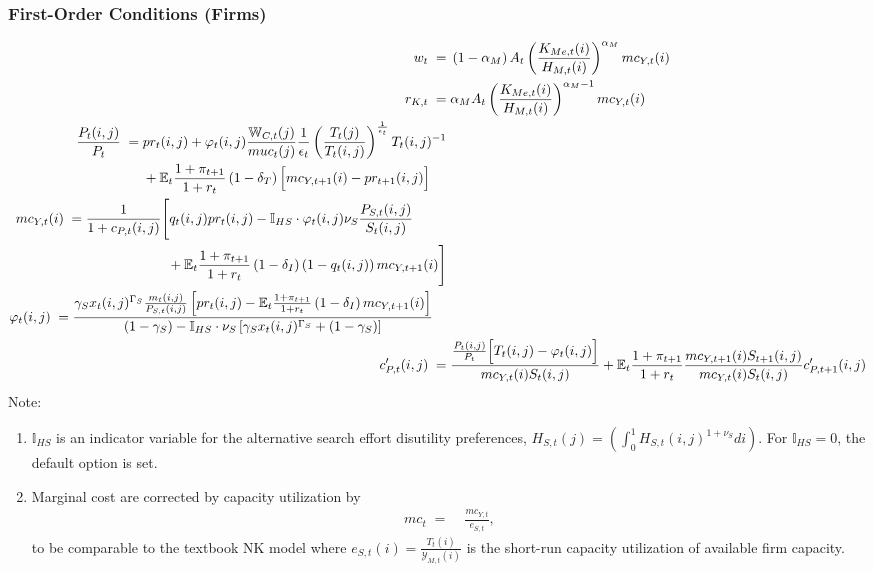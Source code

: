 \documentclass[12pt,3p,authoryear,review]{elsarticle}
\begin{document}
\subsubsection{First-Order Conditions (Firms)}%
\vspace{-0.2in}%
\begin{small}%
	\begin{align}%
		w_t \; = & \; \left(1-\alpha_M\right) A_t \left(\frac{K_{Me,t}(i)}{H_{M,t}(i)}\right)^{\alpha_M} mc_{Y,t}(i)\\%
		r_{K,t} \; = & \; \alpha_M A_t \left(\frac{K_{Me,t}(i)}{H_{M,t}(i)}\right)^{\alpha_M-1} mc_{Y,t}(i)\\%
		\begin{split}%
			\frac{P_t(i,j)}{P_t} \; = & \; pr_t(i,j) + \varphi_t(i,j) \frac{\mathbb{W}_{C,t}(j)}{muc_t(j)} \frac{1}{\epsilon_t} \left(\frac{T_t(j)}{T_t(i,j)}\right)^{\frac{1}{\epsilon_t}} T_t(i,j)^{-1}\\%
			& \; + \mathbb{E}_t \frac{1+\pi_{t+1}}{1+r_t} \left(1-\delta_T\right) \Bigl[mc_{Y,t+1}(i)-pr_{t+1}(i,j)\Bigr]%
		\end{split}\\%
		\begin{split}%
			mc_{Y,t}(i) \; = & \; \frac{1}{1+c_{P,t}(i,j)}  \Biggl[ q_t(i,j) pr_t(i,j) - \mathbb{I}_{HS} \cdot \varphi_t(i,j) \nu_S \frac{P_{S,t}(i,j)}{S_t(i,j)}\\%
			& \; \quad \quad \quad \quad \quad \quad + \mathbb{E}_t \frac{1+\pi_{t+1}}{1+r_t} \left(1-\delta_I\right) \left(1-q_t(i,j)\right) mc_{Y,t+1}(i) \Biggr]%
		\end{split}\\%
		\begin{split}%
			\varphi_t(i,j) \; = & \; \frac{\gamma_S x_t(i,j)^{\Gamma_S} \frac{m_t(i,j)}{P_{S,t}(i,j)} \left[pr_t(i,j) - \mathbb{E}_t \frac{1+\pi_{t+1}}{1+r_t} \left(1-\delta_I\right) mc_{Y,t+1}(i) \right]}{(1-\gamma_S)-\mathbb{I}_{HS}\cdot\nu_S \left[ \gamma_S x_t(i,j)^{\Gamma_S}+\left(1-\gamma_S\right) \right]}
		\end{split}\\%
		c^{\prime}_{P,t}(i,j) \; = & \; \frac{\frac{P_t(i,j)}{P_t} \Bigl[ T_t(i,j) - \varphi_t(i,j) \Bigr]}{mc_{Y,t}(i) S_t(i,j)} + \mathbb{E}_t \frac{1+\pi_{t+1}}{1+r_t} \frac{mc_{Y,t+1}(i) S_{t+1}(i,j)}{mc_{Y,t}(i) S_t(i,j)} c^{\prime}_{P,t+1}(i,j)%
	\end{align}%
	Note:%
	\begin{enumerate}%
		\item $\mathbb{I}_{HS}$ is an indicator variable for the alternative search effort disutility preferences, $H_{S,t}(j) = \left(\int_0^1 H_{S,t}(i,j)^{1+\nu_S}di\right)$. For $\mathbb{I}_{HS}=0$, the default option is set.%
		\item Marginal cost are corrected by capacity utilization by%
	\begin{align}%
		mc_t \; = & \; \frac{mc_{Y,t}}{e_{S,t}},%
	\end{align}%
	to be comparable to the textbook NK model where $e_{S,t}(i) = \frac{T_t(i)}{\mathcal{Y}_{M,t}(i)}$ is the short-run capacity utilization of available firm capacity.%
	\end{enumerate}%
\end{small}%
\end{document}
